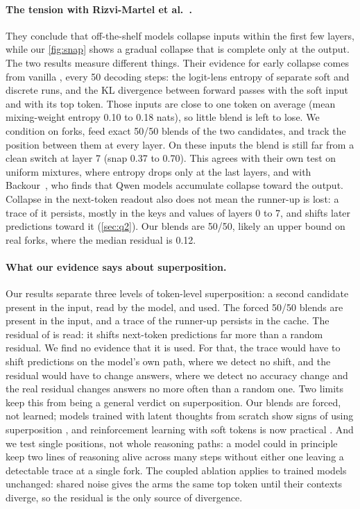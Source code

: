 \paragraph{The tension with Rizvi-Martel et al.~\cite{rizvimartel2026illusion}.}
They conclude that off-the-shelf models collapse \ST{} inputs within the first few layers, while our
\cref{fig:snap} shows a gradual collapse that is complete only at the output.
The two results measure different things.
Their evidence for early collapse comes from vanilla \ST{}, every 50 decoding steps: the logit-lens entropy of %
separate soft and discrete runs, and the KL divergence between forward passes with the soft input and with its top
token.
Those inputs are close to one token on average (mean mixing-weight entropy 0.10 to 0.18 nats), so little blend is %
left to lose.
We condition on forks, feed exact 50/50 blends of the two candidates, and track the position between them at every
layer.
On these inputs the blend is still far from a clean switch at layer 7 (snap 0.37 to 0.70). %
This agrees with their own test on uniform mixtures, where entropy drops only at the last layers, and with
Backour~\cite{backour2026dynamics}, who finds that Qwen models accumulate collapse toward the output.
Collapse in the next-token readout also does not mean the runner-up is lost: a trace of it persists, mostly in the
keys and values of layers 0 to 7, and shifts later predictions toward it (\cref{sec:q2}). %
Our blends are 50/50, likely an upper bound on real forks, where the median residual is 0.12. %

\paragraph{What our evidence says about superposition.}
Our results separate three levels of token-level superposition: a second candidate present in the input, read by
the model, and used.
The forced 50/50 blends are present in the input, and a trace of the runner-up persists in the cache.
The residual of \GST{} is read: it shifts next-token predictions far more than a random residual.
We find no evidence that it is used.
For that, the trace would have to shift predictions on the model's own path, where we detect no shift, and the
residual would have to change answers, where we detect no accuracy change and the real residual changes answers
no more often than a random one.
Two limits keep this from being a general verdict on superposition.
Our blends are forced, not learned; models trained with latent thoughts from scratch show signs of using
superposition \cite{rizvimartel2026illusion}, and reinforcement learning with soft tokens is now practical
\cite{butt2025soft,zheng2025softgrpo}.
And we test single positions, not whole reasoning paths: a model could in principle keep two lines of reasoning
alive across many steps without either one leaving a detectable trace at a single fork.
The coupled ablation applies to trained models unchanged: shared noise gives the arms the same top token until their
contexts diverge, so the residual is the only source of divergence.
